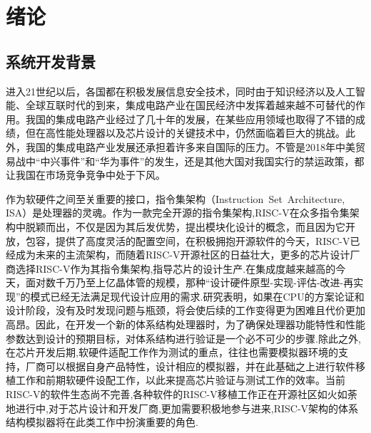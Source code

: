 
\chapter{绪论}

\section{系统开发背景}
进入21世纪以后，各国都在积极发展信息安全技术，同时由于知识经济以及人工智能、全球互联时代的到来，集成电路产业在国民经济中发挥着越来越不可替代的作用。我国的集成电路产业经过了几十年的发展，在某些应用领域也取得了不错的成绩，但在高性能处理器以及芯片设计的关键技术中，仍然面临着巨大的挑战。此外，我国的集成电路产业发展还承担着许多来自国际的压力\cite{huzhenbo,huzhenbo1}。不管是2018年中美贸易战中“中兴事件”和“华为事件”的发生，还是其他大国对我国实行的禁运政策，都让我国在市场竞争竞争中处于下风。


作为软硬件之间至关重要的接口，指令集架构（Instruction Set Architecture, ISA）是处理器的灵魂。作为一款完全开源的指令集架构,RISC-V在众多指令集架构中脱颖而出，不仅是因为其后发优势，提出模块化设计的概念，而且因为它开放，包容，提供了高度灵活的配置空间，在积极拥抱开源软件的今天，RISC-V已经成为未来的主流架构，而随着RISC-V开源社区的日益壮大，更多的芯片设计厂商选择RISC-V作为其指令集架构,指导芯片的设计生产.在集成度越来越高的今天，面对数千万乃至上亿晶体管的规模，那种“设计硬件原型-实现-评估-改进-再实现”的模式已经无法满足现代设计应用的需求\cite{jichengdu}.研究表明，如果在CPU的方案论证和设计阶段，没有及时发现问题与瓶颈，将会使后续的工作变得更为困难且代价更加高昂。因此，在开发一个新的体系结构处理器时，为了确保处理器功能特性和性能参数达到设计的预期目标，对体系结构进行验证是一个必不可少的步骤\cite{buzhou}.除此之外,在芯片开发后期,软硬件适配工作作为测试的重点，往往也需要模拟器环境的支持，厂商可以根据自身产品特性，设计相应的模拟器，并在此基础之上进行软件移植工作和前期软硬件设配工作，以此来提高芯片验证与测试工作的效率。当前RISC-V的软件生态尚不完善,各种软件的RISC-V移植工作正在开源社区如火如荼地进行中,对于芯片设计和开发厂商,更加需要积极地参与进来,RISC-V架构的体系结构模拟器将在此类工作中扮演重要的角色.



